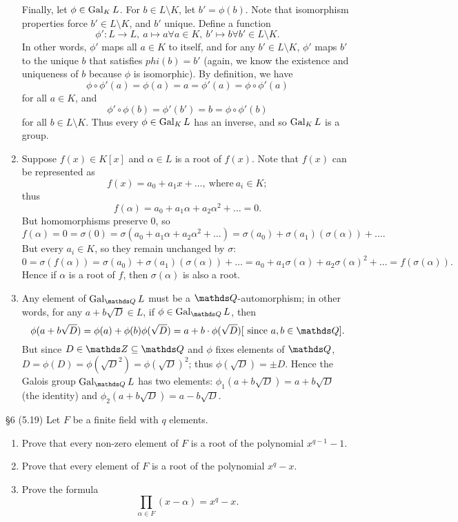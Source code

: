 \documentclass{homework}
\begin{document}
\begin{solution}
\begin{enumerate}[label=(\alph*)]
      Finally, let $\phi\in \operatorname{Gal}_KL$. For $b\in L\setminus K$, let $b'=\phi(b)$. Note that
      isomorphism properties force $b'\in L\setminus K$, and $b'$ unique. Define a function \[
        \phi':L\to L,\ a\mapsto a \forall a\in K,\ b'\mapsto b \forall b'\in L\setminus K
      .\] In other words, $\phi'$ maps all $a\in K$ to itself, and for any $b'\in L\setminus K$,
      $\phi'$ maps $b'$ to the unique $b$ that satisfies $phi(b)=b'$ (again, we know the existence
      and uniqueness of $b$ because $\phi$ is isomorphic). By definition, we have \[
        \phi\circ \phi'(a)=\phi(a)=a=\phi'(a)=\phi\circ \phi'(a)
      \] for all $a\in K$, and \[
      \phi'\circ \phi(b)=\phi'(b')=b=\phi\circ \phi'(b)
      \] for all $b\in L\setminus K$. Thus every $\phi\in \operatorname{Gal}_KL$ has an inverse, and so $\operatorname{Gal}_KL$
      is a group.
    \item Suppose $f(x)\in K[x]$ and $\alpha\in L$ is a root of $f(x)$. Note that $f(x)$ can be
      represented as \[
        f(x)=a_0+a_1x+\ldots,~\text{where}~a_i\in K
      ;\] thus \[
        f(\alpha)=a_0+a_1\alpha+a_2\alpha^2+\ldots=0
      .\] But homomorphisms preserve $0$, so \[
      f(\alpha)=0=\sigma(0)=\sigma(a_0+a_1\alpha+a_2\alpha^2+\ldots)=\sigma(a_0)+\sigma(a_1)(\sigma(\alpha))+\ldots
      .\] But every $a_i\in K$, so they remain unchanged by $\sigma$: \[
        0=\sigma(f(\alpha))=\sigma(a_0)+\sigma(a_1)(\sigma(\alpha))+\ldots=a_0+a_1\sigma(\alpha)+a_2\sigma(\alpha)^2+\ldots=f(\sigma(\alpha)) 
      .\] Hence if $\alpha$ is a root of $f$, then $\sigma(\alpha)$ is also a root.
    \item Any element of $\Gal_{\Q}L$ must be a $\Q$-automorphism; in other words, for any
      $a+b\sqrt{D}\in L$, if $\phi\in \Gal_{\Q}L$, then \[
        \phi(a+b\sqrt{D})=\phi(a)+\phi(b)\phi(\sqrt{D})=a+b\cdot \phi(\sqrt{D}) [~\text{since}~
        a,b\in \Q]
      .\] But since $D\in \Z\subseteq \Q$ and $\phi$ fixes elements of $\Q$,
      $D=\phi(D)=\phi(\sqrt{D}^2)=\phi(\sqrt{D})^2$; thus $\phi(\sqrt{D})=\pm D$. Hence the Galois
      group $\Gal_{\Q}L$ has two elements: $\phi_1(a+b\sqrt{D})=a+b\sqrt{D}$ (the identity) and
      $\phi_2(a+b\sqrt{D})=a-b\sqrt{D}$.
  \end{enumerate}
\end{solution}

\begin{problem}{\S 6}
  (5.19) Let $F$ be a finite field with $q$ elements.
  \begin{enumerate}[label=(\alph*)]
    \item Prove that every non-zero element of $F$ is a root of the polynomial $x^{q-1}-1$.
    \item Prove that every element of $F$ is a root of the polynomial $x^q-x$.
    \item Prove the formula \[
        \prod_{\alpha\in F}(x-\alpha)=x^q-x  
    .\] 
  \end{enumerate}
\end{problem}
\end{document}
